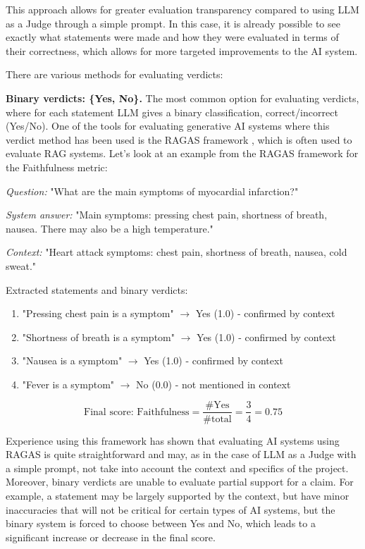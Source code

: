 \documentclass[sn-basic]{sn-jnl}
\theoremstyle{thmstyleone}%
\theoremstyle{thmstyletwo}%
\theoremstyle{thmstylethree}%
\begin{document}
This approach allows for greater evaluation transparency compared to using LLM as a Judge through a simple prompt. In this case, it is already possible to see exactly what statements were made and how they were evaluated in terms of their correctness, which allows for more targeted improvements to the AI system.

There are various methods for evaluating verdicts: 

\textbf{Binary verdicts: \{Yes, No\}.} The most common option for evaluating verdicts, where for each statement LLM gives a binary classification, correct/incorrect (Yes/No). One of the tools for evaluating generative AI systems where this verdict method has been used is the RAGAS framework \cite{Es2023}, which is often used to evaluate RAG systems. Let's look at an example from the RAGAS framework for the Faithfulness metric:

\textit{Question:} "What are the main symptoms of myocardial infarction?" 

\textit{System answer:} "Main symptoms: pressing chest pain, shortness of breath, nausea. There may also be a high temperature." 

\textit{Context:} "Heart attack symptoms: chest pain, shortness of breath, nausea, cold sweat."

Extracted statements and binary verdicts: 
\begin{enumerate} 
\item "Pressing chest pain is a symptom" $\to$ Yes (1.0) - confirmed by context 
\item "Shortness of breath is a symptom" $\to$ Yes (1.0) - confirmed by context 
\item "Nausea is a symptom" $\to$ Yes (1.0) - confirmed by context 
\item "Fever is a symptom" $\to$ No (0.0) - not mentioned in context 
\end{enumerate} 

\begin{equation} 
\text{Final score: Faithfulness} = \frac{\#\text{Yes}}{\#\text{total}} = \frac{3}{4} = 0.75
\end{equation} 

Experience using this framework has shown that evaluating AI systems using RAGAS is quite straightforward and may, as in the case of LLM as a Judge with a simple prompt, not take into account the context and specifics of the project. Moreover, binary verdicts are unable to evaluate partial support for a claim. For example, a statement may be largely supported by the context, but have minor inaccuracies that will not be critical for certain types of AI systems, but the binary system is forced to choose between Yes and No, which leads to a significant increase or decrease in the final score.
\end{document}
